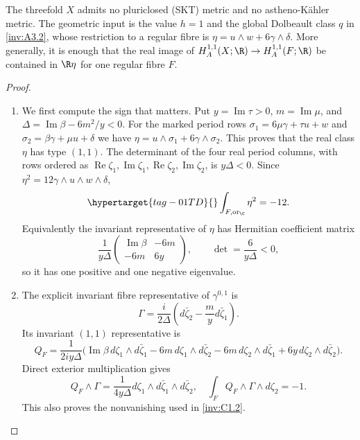 \begin{proposition}\hypertarget{tag-01SK}{}\label{inv:C3.7}

The threefold $X$ admits no pluriclosed (SKT) metric and no
astheno-K\"ahler metric.  The geometric input is the value $h=1$
and the global Dolbeault class $q$ in \ref{inv:A3.2}, whose restriction to a
regular fibre is $\eta=u\wedge w+6\gamma\wedge\delta$.
More generally, it is enough that the real image of
$H_A^{1,1}(X;\R)\to H_A^{1,1}(F;\R)$ be contained in
$\R\eta$ for one regular fibre $F$.
\end{proposition}


\begin{proof}
\begin{enumerate}[label=\arabic*.,leftmargin=*]
\item We first compute the sign that matters.  Put
$y=\operatorname{Im}\tau>0$, $m=\operatorname{Im}\mu$, and
$\Delta=\operatorname{Im}\beta-6m^2/y<0$.
For the marked period rows
$\sigma_1=6\mu\gamma+\tau u+w$ and
$\sigma_2=\beta\gamma+\mu u+\delta$ we have
$\eta=u\wedge\sigma_1+6\gamma\wedge\sigma_2$.
This proves that the real class $\eta$ has type $(1,1)$.
The determinant of the four real period columns, with rows ordered
as $\operatorname{Re}\zeta_1,\operatorname{Im}\zeta_1,
\operatorname{Re}\zeta_2,\operatorname{Im}\zeta_2$, is
$y\Delta<0$.  Since $\eta^2=12\gamma\wedge u\wedge w\wedge\delta$,
\begin{equation}\hypertarget{tag-01TD}{}\label{inv:eq:C-eta-negative}
\int_{F,\mathrm{or}_{\C}}\eta^2=-12.
\end{equation}
Equivalently the invariant representative of $\eta$ has Hermitian
coefficient matrix
\[
\frac1{y\Delta}
\begin{pmatrix}\operatorname{Im}\beta&-6m\\-6m&6y\end{pmatrix},
\qquad \det=\frac6{y\Delta}<0,
\]
so it has one positive and one negative eigenvalue.  

\item The explicit invariant fibre representative of $\gamma^{0,1}$ is
\begin{equation}
\Gamma=\frac{i}{2\Delta}
\left(d\bar\zeta_2-\frac myd\bar\zeta_1\right).
\label{I:eq:fibre-gamma}
\end{equation}
Its invariant $(1,1)$ representative is
\begin{equation}
Q_F=\frac1{2iy\Delta}\bigl(
\operatorname{Im}\beta\,d\zeta_1\wedge d\bar\zeta_1
-6m\,d\zeta_1\wedge d\bar\zeta_2
-6m\,d\zeta_2\wedge d\bar\zeta_1
+6y\,d\zeta_2\wedge d\bar\zeta_2\bigr).
\label{I:eq:fibre-eta-form}
\end{equation}
Direct exterior multiplication gives
\[
Q_F\wedge\Gamma=
\frac1{4y\Delta}
d\zeta_1\wedge d\bar\zeta_1\wedge d\bar\zeta_2,
\quad
\int_FQ_F\wedge\Gamma\wedge d\zeta_2=-1.
\]
This also proves the nonvanishing used in \ref{inv:C1.2}.


\end{enumerate}
\end{proof}
